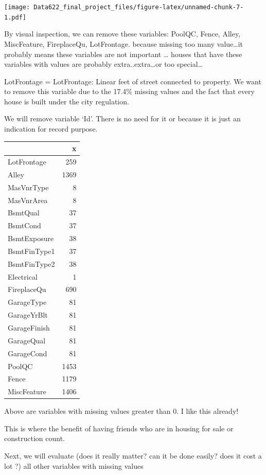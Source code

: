 \documentclass[
]{article}
\begin{document}
\texttt{[image: Data622\_final\_project\_files/figure-latex/unnamed-chunk-7-1.pdf]}

By visual inspection, we can remove these variables: PoolQC, Fence,
Alley, MiscFeature, FireplaceQu, LotFrontage. because missing too many
value\ldots it probably means these variables are not important \ldots{}
houses that have these variables with values are probably
extra..extra\ldots or too special\ldots{}

LotFrontage = LotFrontage: Linear feet of street connected to property.
We want to remove this variable due to the 17.4\% missing values and the
fact that every house is built under the city regulation.

We will remove variable `Id'. There is no need for it or because it is
just an indication for record purpose.

\begin{longtable}[]{@{}lr@{}}
\toprule
& x \\
\midrule
\endhead
LotFrontage & 259 \\
Alley & 1369 \\
MasVnrType & 8 \\
MasVnrArea & 8 \\
BsmtQual & 37 \\
BsmtCond & 37 \\
BsmtExposure & 38 \\
BsmtFinType1 & 37 \\
BsmtFinType2 & 38 \\
Electrical & 1 \\
FireplaceQu & 690 \\
GarageType & 81 \\
GarageYrBlt & 81 \\
GarageFinish & 81 \\
GarageQual & 81 \\
GarageCond & 81 \\
PoolQC & 1453 \\
Fence & 1179 \\
MiscFeature & 1406 \\
\bottomrule
\end{longtable}

Above are variables with missing values greater than 0. I like this
already!

This is where the benefit of having friends who are in housing for sale
or construction count.

Next, we will evaluate (does it really matter? can it be done easily?
does it cost a lot ?) all other variables with missing values
\end{document}
